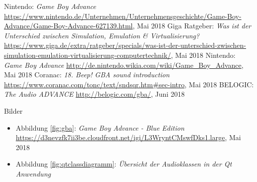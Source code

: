 \documentclass[11pt,a4paper]{scrartcl}
\begin{document}
\begin{thebibliography}{tiefe}
    Nintendo: \textit{Game Boy Advance}\newline
    \url{https://www.nintendo.de/Unternehmen/Unternehmensgeschichte/Game-Boy-Advance/Game-Boy-Advance-627139.html}, Mai 2018
    Giga Ratgeber: \textit{Was ist der Unterschied zwischen Simulation, Emulation \& Virtualisierung?}\newline
    \url{https://www.giga.de/extra/ratgeber/specials/was-ist-der-unterschied-zwischen-simulation-emulation-virtualisierung-computertechnik/}, Mai 2018
    Nintendo: \textit{Game Boy Advance}\newline
    \url{http://de.nintendo.wikia.com/wiki/Game_Boy_Advance}, Mai 2018
    Coranac: \textit{18. Beep! GBA sound introduction}\newline
    \url{https://www.coranac.com/tonc/text/sndsqr.htm#sec-intro}, Mai 2018
    BELOGIC: \textit{The Audio ADVANCE}\newline
    \url{http://belogic.com/gba/}, Juni 2018
\end{thebibliography}

\vspace{1cm}

\huge Bilder
\normalsize

\begin{itemize}
    \item Abbildung \ref{fig:gba}: \textit{Game Boy Advance - Blue Edition}\newline
    \url{https://d3nevzfk7ii3be.cloudfront.net/igi/L3WryntCMswfDks1.large}, Mai 2018
\end{itemize}

\begin{itemize}
    \item Abbildung \ref{fig:qtclassdiagramm}: \textit{\"Ubersicht der Audioklassen in der Qt Anwendung}
\end{itemize}
\end{document}
